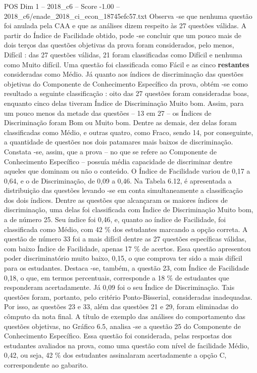 \begin{textsample}{POS Dim 1 – 2018\_c6 – Score -1.00 – 2018\_c6/enade\_2018\_ci\_econ\_18745efc57.txt}
Observa -se que nenhuma questão foi anulada pela CAA e que as análises dizem respeito às 27 questões válidas.
A partir do Índice de Facilidade obtido, pode -se concluir que um pouco mais de dois terços das questões objetivas da prova foram considerados, pelo menos, Difícil : das 27 questões válidas, 21 foram classificadas como Difícil e nenhuma como Muito difícil.
Uma questão foi classificada como Fácil e as cinco \textbf{restantes} consideradas como Médio.
Já quanto aos índices de discriminação das questões objetivas do Componente de Conhecimento Específico da prova, obtém -se como resultado a seguinte classificação : oito das 27 questões foram consideradas boas, enquanto cinco delas tiveram Índice de Discriminação Muito bom.
Assim, para um pouco menos da metade das questões – 13 em 27 – os Índices de Discriminação foram Bom ou Muito bom.
Dentre as demais, dez delas foram classificadas como Médio, e outras quatro, como Fraco, sendo 14, por conseguinte, a quantidade de questões nos dois patamares mais baixos de discriminação.
Constata -se, assim, que a prova – no que se refere ao Componente de Conhecimento Específico – possuía média capacidade de discriminar dentre aqueles que dominam ou não o conteúdo.
O Índice de Facilidade variou de 0,17 a 0,64, e o de Discriminação, de 0,09 a 0,46.
Na Tabela 6.12, é apresentada a distribuição das questões levando -se em conta simultaneamente a classificação dos dois índices.
Dentre as questões que alcançaram os maiores índices de discriminação, uma delas foi classificada com Índice de Discriminação Muito bom, a de número 25.
Seu índice foi 0,46, e, quanto ao índice de Facilidade, foi classificada como Médio, com 42 \% dos estudantes marcando a opção correta.
A questão de número 33 foi a mais difícil dentre as 27 questões específicas válidas, com baixo Índice de Facilidade, apenas 17 \% de acertos.
Essa questão apresentou poder discriminatório muito baixo, 0,15, o que comprova ter sido a mais difícil para os estudantes.
Destaca -se, também, a questão 23, com Índice de Facilidade 0,18, o que, em termos percentuais, corresponde a 18 \% de estudantes que responderam acertadamente.
Já 0,09 foi o seu Índice de Discriminação.
Tais questões foram, portanto, pelo critério Ponto-Bisserial, consideradas inadequadas.
Por isso, as questões 23 e 33, além das questões 21 e 29, foram eliminadas do cômputo da nota final.
A título de exemplo das análises do comportamento das questões objetivas, no Gráfico 6.5, analisa -se a questão 25 do Componente de Conhecimento Específico.
Essa questão foi considerada, pelas respostas dos estudantes avaliados na prova, como uma questão com nível de facilidade Médio, 0,42, ou seja, 42 \% dos estudantes assinalaram acertadamente a opção C, correspondente ao gabarito.

\end{textsample}
